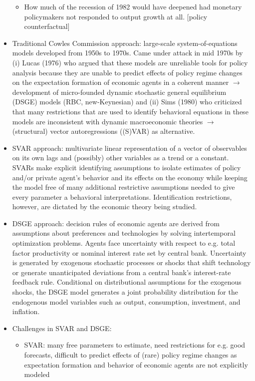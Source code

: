 \documentclass[a4paper]{scrartcl}
\begin{document}
\begin{solution}
\begin{itemize}
\begin{itemize}
	\item How much of the recession of 1982  would have deepened had monetary policymakers not responded to output growth at all. [policy counterfactual]
\end{itemize}
\item Traditional Cowles Commission approach: large-scale system-of-equations models developed from 1950s to 1970s. Came under attack in mid 1970s by (i) Lucas (1976) who argued that these models are unreliable tools for policy analysis because they are unable to predict effects of policy regime changes on the expectation formation of economic agents in a coherent manner $\rightarrow$ development of micro-founded dynamic stochastic general equilibrium (DSGE) models (RBC, new-Keynesian) and (ii) Sims (1980) who criticized that many restrictions that are used to identify behavioral equations in these models are inconsistent with dynamic macroeconomic theories $\rightarrow$ (structural) vector autoregressions ((S)VAR) as alternative.
\item SVAR approach: multivariate linear representation of a vector of observables on its own lags and (possibly) other variables as a trend or a constant. SVARs make explicit identifying assumptions to isolate estimates of policy and/or private agent's behavior and its effects on the economy while keeping the model free of many additional restrictive assumptions needed to give every parameter a behavioral interpretations. Identification restrictions, however, are dictated by the economic theory being studied.
\item DSGE approach: decision rules of economic agents are derived from assumptions about preferences and technologies by solving intertemporal optimization problems. Agents face uncertainty with respect to e.g. total factor productivity or nominal interest rate set by central bank. Uncertainty is generated by exogenous stochastic processes or shocks that shift technology or generate unanticipated deviations from a central bank's interest-rate feedback rule. Conditional on distributional assumptions for the exogenous shocks, the DSGE model generates a joint probability distribution for the endogenous model variables such as output, consumption, investment, and inflation.
\item Challenges in SVAR and DSGE: 
\begin{itemize}
	\item SVAR: many free parameters to estimate, need restrictions for e.g. good forecasts, difficult to predict effects of (rare) policy regime changes as expectation formation and behavior of economic agents are not explicitly modeled

\end{itemize}
\end{itemize}
\end{solution}
\end{document}
